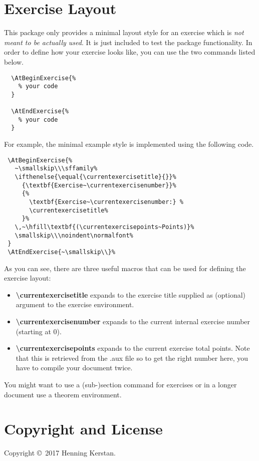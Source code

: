 \documentclass[
  twocolumn,%
  fontsize=9pt,%
  DIV=calc,%
  numbers=noendperiod%
]{scrartcl}
\begin{document}
\section{Exercise Layout}
This package only provides a minimal layout style for an exercise which is \emph{not meant to be actually used}. It is just included to test the package functionality. In order to define how your exercise looks like, you can use the two commands listed below.
\begin{lstlisting}
  \AtBeginExercise{%
    % your code
  }

  \AtEndExercise{%
    % your code
  }
\end{lstlisting}
For example, the minimal example style is implemented using the following code.
\begin{lstlisting}
 \AtBeginExercise{%
   ~\smallskip\\\sffamily%
   \ifthenelse{\equal{\currentexercisetitle}{}}%
     {\textbf{Exercise~\currentexercisenumber}}%
     {%
       \textbf{Exercise~\currentexercisenumber:} %
       \currentexercisetitle%
     }%
   \,~\hfill\textbf{(\currentexercisepoints~Points)}%
   \smallskip\\\noindent\normalfont%
 }
 \AtEndExercise{~\smallskip\\}%
\end{lstlisting}
As you can see, there are three useful macros that can be used for defining the exercise layout:
\begin{itemize}
  \item \textcolor{NavyBlue}{\ttfamily\bfseries\textbackslash currentexercisetitle} expands to the exercise title supplied as (optional) argument to the exercise environment.
  \item \textcolor{NavyBlue}{\ttfamily\bfseries\textbackslash currentexercisenumber} expands to the current internal exercise number (starting at $0$). 
  \item \textcolor{NavyBlue}{\ttfamily\bfseries\textbackslash currentexercisepoints} expands to the current exercise total points. Note that this is retrieved from the .aux file so to get the right number here, you have to compile your document twice.
\end{itemize}

\noindent You might want to use a (sub-)section command for exercises or in a longer document use a theorem environment.

\section{Copyright and License}
Copyright \copyright\ 2017 Henning Kerstan.\medskip
\end{document}
